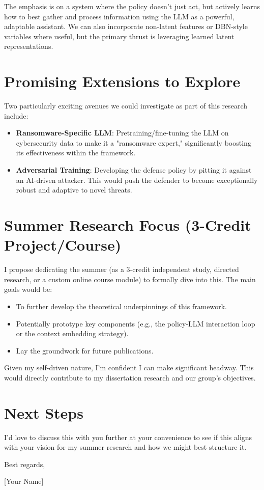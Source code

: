 \documentclass[11pt]{article}
\begin{document}
The emphasis is on a system where the policy doesn't just act, but actively learns how to best gather and process information using the LLM as a powerful, adaptable assistant. We can also incorporate non-latent features or DBN-style variables where useful, but the primary thrust is leveraging learned latent representations.

\section*{Promising Extensions to Explore}

Two particularly exciting avenues we could investigate as part of this research include:

\begin{itemize}
    \item \textbf{Ransomware-Specific LLM}: Pretraining/fine-tuning the LLM on cybersecurity data to make it a "ransomware expert," significantly boosting its effectiveness within the framework.
    \item \textbf{Adversarial Training}: Developing the defense policy by pitting it against an AI-driven attacker. This would push the defender to become exceptionally robust and adaptive to novel threats.
\end{itemize}

\section*{Summer Research Focus (3-Credit Project/Course)}

I propose dedicating the summer (as a 3-credit independent study, directed research, or a custom online course module) to formally dive into this. The main goals would be:
\begin{itemize}
    \item To further develop the theoretical underpinnings of this framework.
    \item Potentially prototype key components (e.g., the policy-LLM interaction loop or the context embedding strategy).
    \item Lay the groundwork for future publications.
\end{itemize}
Given my self-driven nature, I'm confident I can make significant headway. This would directly contribute to my dissertation research and our group's objectives.

\section*{Next Steps}

I'd love to discuss this with you further at your convenience to see if this aligns with your vision for my summer research and how we might best structure it.

\vspace{1em}
Best regards,

[Your Name]
\end{document}
